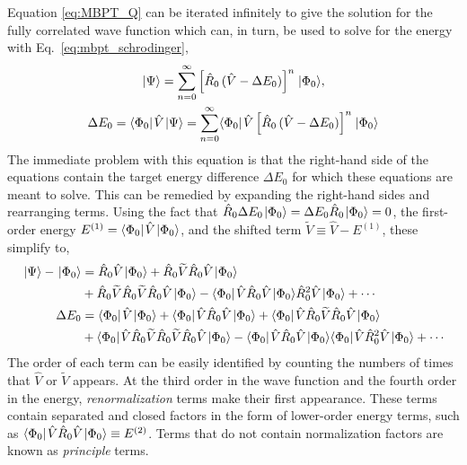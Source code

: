 \documentclass[thesis.tex]{subfiles}
\begin{document}
Equation \eqref{eq:MBPT_Q} can be iterated infinitely to give the solution for the fully correlated wave function which can, in turn, be used to solve for the energy with Eq.\ \eqref{eq:mbpt_schrodinger},
\begin{gather}
  \hspace{1pt}\lvert \Psi \rangle = \sum_{n=0}^{\infty}\left[\hat{R}_{0}\mathop{(\hat{V} - \Delta E_{0})}\right]^{n}\hspace{1pt}\lvert \Phi_{0} \rangle, \\
  \Delta E_{0} = \langle \Phi_{0} |\hspace{1pt}\hat{V}\hspace{1pt}\lvert \Psi \rangle = \sum_{n=0}^{\infty}\langle \Phi_{0} |\hspace{1pt}\hat{V}\left[\hat{R}_{0}\mathop{(\hat{V} - \Delta E_{0})}\right]^{n}\hspace{1pt}\lvert \Phi_{0} \rangle
\end{gather}
The immediate problem with this equation is that the right-hand side of the equations contain the target energy difference $\Delta E_{0}$ for which these equations are meant to solve.  This can be remedied by expanding the right-hand sides and rearranging terms.  Using the fact that $\hat{R}_{0}\Delta E_{0}\hspace{1pt}\lvert \Phi_{0} \rangle = \Delta E_{0}\hat{R}_{0}\hspace{1pt}\lvert \Phi_{0} \rangle = 0$, the first-order energy $E^{(1)} = \langle \Phi_{0} |\hspace{1pt}\hat{V}\hspace{1pt}\lvert \Phi_{0} \rangle$, and the shifted term $\widetilde{V} \equiv \hat{V} - E^{(1)}$, these simplify to,
\begin{align}
  \hspace{1pt}\lvert \Psi \rangle - \hspace{1pt}\lvert \Phi_{0} \rangle &= \hat{R}_{0}\hat{V}\hspace{1pt}\lvert \Phi_{0} \rangle + \hat{R}_{0}\widetilde{V}\hat{R}_{0}\hat{V}\hspace{1pt}\lvert \Phi_{0} \rangle \notag \\
  &+ \hat{R}_{0}\widetilde{V}\hat{R}_{0}\widetilde{V}\hat{R}_{0}\hat{V}\hspace{1pt}\lvert \Phi_{0} \rangle - \langle \Phi_{0} |\hspace{1pt}\hat{V}\hat{R}_{0}\hat{V}\hspace{1pt}\lvert \Phi_{0} \rangle\hat{R}^{2}_{0}\hat{V}\hspace{1pt}\lvert \Phi_{0} \rangle + \cdots \\
  \Delta E_{0} &= \langle \Phi_{0} |\hspace{1pt}\hat{V}\hspace{1pt}\lvert \Phi_{0} \rangle + \langle \Phi_{0} |\hspace{1pt}\hat{V}\hat{R}_{0}\hat{V}\hspace{1pt}\lvert \Phi_{0} \rangle + \langle \Phi_{0} |\hspace{1pt}\hat{V}\hat{R}_{0}\widetilde{V}\hat{R}_{0}\hat{V}\hspace{1pt}\lvert \Phi_{0} \rangle \notag \\
  &+ \langle \Phi_{0} |\hspace{1pt}\hat{V}\hat{R}_{0}\widetilde{V}\hat{R}_{0}\widetilde{V}\hat{R}_{0}\hat{V}\hspace{1pt}\lvert \Phi_{0} \rangle - \langle \Phi_{0} |\hspace{1pt}\hat{V}\hat{R}_{0}\hat{V}\hspace{1pt}\lvert \Phi_{0} \rangle\langle \Phi_{0} |\hspace{1pt}\hat{V}\hat{R}^{2}_{0}\hat{V}\hspace{1pt}\lvert \Phi_{0} \rangle + \cdots
\end{align}
The order of each term can be easily identified by counting the numbers of times that $\hat{V}$ or $\widetilde{V}$ appears.  At the third order in the wave function and the fourth order in the energy, \textit{renormalization} terms make their first appearance.  These terms contain separated and closed factors in the form of lower-order energy terms, such as $\langle \Phi_{0} |\hspace{1pt}\hat{V}\hat{R}_{0}\hat{V}\hspace{1pt}\lvert \Phi_{0} \rangle \equiv E^{(2)}$.  Terms that do not contain normalization factors are known as \textit{principle} terms.
\end{document}
